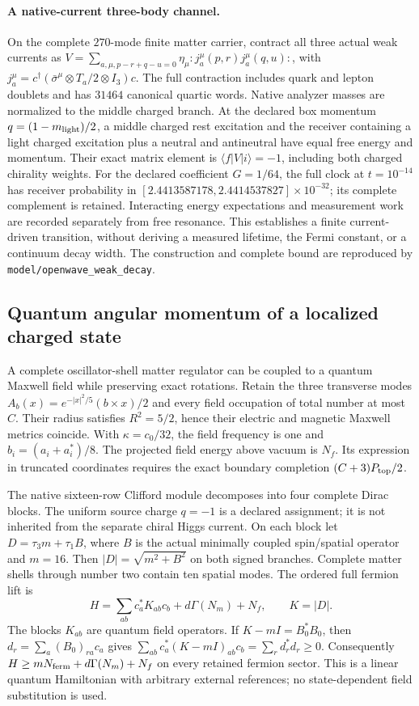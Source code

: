 \paragraph{A native-current three-body channel.}
On the complete $270$-mode finite matter carrier, contract all three actual
weak currents as
$V=\sum_{a,\mu,p-r+q-u=0}\eta_\mu:j_a^\mu(p,r)j_a^\mu(q,u):$,
with $j_a^\mu=c^\dagger(\bar\sigma^\mu\otimes T_a/2\otimes I_3)c$.
The full contraction includes quark and lepton doublets and has $31464$
canonical quartic words. Native analyzer masses are normalized to the
middle charged branch. At the declared box momentum
$q=(1-m_{\rm light})/2$, a middle charged rest excitation and the receiver
containing a light charged excitation plus a neutral and antineutral have
equal free energy and momentum. Their exact matrix element is
$\langle f|V|i\rangle=-1$, including both charged chirality weights.
For the declared coefficient $G=1/64$, the full clock at $t=10^{-14}$ has
receiver probability in
$[2.4413587178,2.4414537827]\times10^{-32}$; its complete complement is
retained. Interacting energy expectations and measurement work are recorded
separately from free resonance. This establishes a finite current-driven
transition, without deriving a measured lifetime, the Fermi constant, or a
continuum decay width. The construction and complete bound are reproduced
by \texttt{model/openwave\_weak\_decay}.


\subsection{Quantum angular momentum of a localized charged state}

A complete oscillator-shell matter regulator can be coupled to a quantum
Maxwell field while preserving exact rotations. Retain the three transverse
modes $A_b(x)=e^{-|x|^2/5}(b\times x)/2$ and every field occupation of total
number at most $C$. Their radius satisfies $R^2=5/2$, hence their electric
and magnetic Maxwell metrics coincide. With $\kappa=c_0/32$, the field
frequency is one and $b_i=(a_i+a_i^*)/8$. The projected field energy above
vacuum is $N_f$. Its expression in truncated coordinates requires the exact
boundary completion $(C+3)P_{\rm top}/2$.

The native sixteen-row Clifford module decomposes into four complete Dirac
blocks. The uniform source charge $q=-1$ is a declared assignment; it
is not inherited from the separate chiral Higgs current. On each block let $D=\tau_3m+\tau_1B$, where $B$ is the actual
minimally coupled spin/spatial operator and $m=16$. Then
$|D|=\sqrt{m^2+B^2}$ on both signed branches. Complete matter shells through
number two contain ten spatial modes. The ordered full fermion lift is
\[
 H=\sum_{ab}c_a^*K_{ab}c_b+d\Gamma(N_m)+N_f,
 \qquad K=|D|.
\]
The blocks $K_{ab}$ are quantum field operators. If $K-mI=B_0^*B_0$, then
$d_r=\sum_a(B_0)_{ra}c_a$ gives
$\sum_{ab}c_a^*(K-mI)_{ab}c_b=\sum_r d_r^*d_r\ge0$.
Consequently $H\ge mN_{\rm ferm}+d\Gamma(N_m)+N_f$ on every retained
fermion sector. This is a linear quantum Hamiltonian with arbitrary
external references; no state-dependent field substitution is used.

